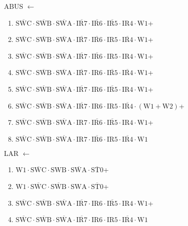 \documentclass[UTF8]{ctexart}
\begin{document}
ABUS $\leftarrow$
\begin{enumerate}[\indent\indent]
	\item $\overline{\text{SWC}} \cdot\overline{\text{SWB}}\cdot \overline{\text{SWA}} \cdot \overline{\text{IR7}} \cdot \overline{\text{IR6}} \cdot \overline{\text{IR5}} \cdot \text{IR4} \cdot \text{W1}$+
	\item $\overline{\text{SWC}} \cdot\overline{\text{SWB}}\cdot \overline{\text{SWA}} \cdot \overline{\text{IR7}} \cdot \overline{\text{IR6}} \cdot \text{IR5} \cdot \overline{\text{IR4}} \cdot \text{W1}$+
	\item $\overline{\text{SWC}} \cdot\overline{\text{SWB}}\cdot \overline{\text{SWA}} \cdot \overline{\text{IR7}} \cdot \overline{\text{IR6}} \cdot \text{IR5} \cdot \text{IR4} \cdot \text{W1}$+
	\item $\overline{\text{SWC}} \cdot\overline{\text{SWB}}\cdot \overline{\text{SWA}} \cdot \overline{\text{IR7}} \cdot \text{IR6} \cdot \overline{\text{IR5}} \cdot \overline{\text{IR4}} \cdot \text{W1}$+
	\item $\overline{\text{SWC}} \cdot\overline{\text{SWB}}\cdot \overline{\text{SWA}} \cdot \overline{\text{IR7}} \cdot \text{IR6} \cdot \overline{\text{IR5}} \cdot \text{IR4} \cdot \text{W1}$+
	\item $\overline{\text{SWC}} \cdot\overline{\text{SWB}}\cdot \overline{\text{SWA}} \cdot \overline{\text{IR7}} \cdot \text{IR6} \cdot \text{IR5} \cdot \overline{\text{IR4}} \cdot (\text{W1} + \text{W2})$+
	\item $\overline{\text{SWC}} \cdot\overline{\text{SWB}}\cdot \overline{\text{SWA}} \cdot \text{IR7} \cdot \overline{\text{IR6}} \cdot \overline{\text{IR5}} \cdot \text{IR4} \cdot \text{W1}$+
	\item $\overline{\text{SWC}} \cdot\overline{\text{SWB}}\cdot \overline{\text{SWA}} \cdot \text{IR7} \cdot \overline{\text{IR6}} \cdot \text{IR5} \cdot \overline{\text{IR4}} \cdot \text{W1}$
\end{enumerate}

LAR $\leftarrow$
\begin{enumerate}[\indent\indent]
	\item $\text{W1} \cdot \overline{\text{SWC}} \cdot \text{SWB} \cdot \overline{\text{SWA}} \cdot \overline{\text{ST0}}$+
	\item $\text{W1} \cdot \overline{\text{SWC}} \cdot \overline{\text{SWB}} \cdot \text{SWA} \cdot \overline{\text{ST0}}$+
	\item $\overline{\text{SWC}} \cdot\overline{\text{SWB}}\cdot \overline{\text{SWA}} \cdot \overline{\text{IR7}} \cdot \text{IR6} \cdot \overline{\text{IR5}} \cdot \text{IR4} \cdot \text{W1}$+
	\item $\overline{\text{SWC}} \cdot\overline{\text{SWB}}\cdot \overline{\text{SWA}} \cdot \overline{\text{IR7}} \cdot \text{IR6} \cdot \text{IR5} \cdot \overline{\text{IR4}} \cdot \text{W1}$
\end{enumerate}
\end{document}
